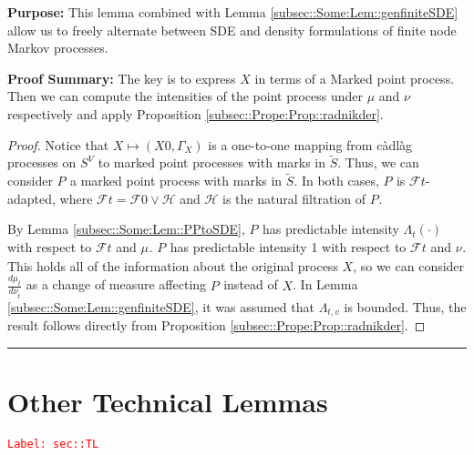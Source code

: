 \documentclass[12pt]{article}
\newcommand{\mc}{\mathcal}
\newcommand{\tr}{\textcolor{red}}
\newcommand{\labe}[1]{\tr{\texttt{Label: #1}}}
\newcommand{\purpose}{\textbf{Purpose: }}
\newcommand{\pfsum}{\textbf{Proof Summary: }}
\newcommand{\ind}{\hspace{24pt}}
\newcommand{\lin}{\rule{\linewidth}{0.4 pt}}
\renewcommand{\v}{v}							%
\renewcommand{\S}{S}							%
\renewcommand{\t}{t}							%
\newcommand{\F}{\mc{F}}							%
\newcommand{\FH}[2]{\mc{H}}						%
\newcommand{\X}{X}								%
\newcommand{\V}{V}									%
\newcommand{\rp}[1]{P^{#1}}							%
\newcommand{\m}[3]{\mu_{#2#1}^{#3}}						%
\newcommand{\mm}[3]{\nu_{#2#1}^{#3}}						%
\newcommand{\ratee}[1]{\Lambda_{#1}}				%
\newcommand{\alt}{\widetilde}						%
\newcommand{\pmap}[1]{\Gamma_{#1}}				%
\begin{document}
\purpose This lemma combined with Lemma \ref{subsec::Some:Lem::genfiniteSDE} allow us to freely alternate between SDE and density formulations of finite node Markov processes.

\pfsum The key is to express \(X\) in terms of a Marked point process. Then we can compute the intensities of the point process under \(\mu\) and \(\nu\) respectively and apply Proposition \ref{subsec::Prope:Prop::radnikder}.

\begin{proof}
Notice that \(\X{}{} \mapsto (\X{}{0},\pmap{\X{}{}})\) is a one-to-one mapping from c\`adl\`ag processes on \(\S^\V\) to marked point processes with marks in \(\alt{\S}\). Thus, we can consider \(\rp{}\) a marked point process with marks in \(\alt{\S}\). In both cases, \(\rp{}\) is \(\F{}{\t}\)-adapted, where \(\F{}{\t} = \F{}{0}\vee \FH{}{\t}\) and \(\FH{}{\t}\) is the natural filtration of \(\rp{}\).

\ind By Lemma \ref{subsec::Some:Lem::PPtoSDE}, \(\rp{}\) has predictable intensity \(\ratee{\t}(\cdot)\) with respect to \(\F{}{\t}\) and \(\m{}{}{}\). \(\rp{}\) has predictable intensity 1 with respect to \(\F{}{\t}\) and \(\mm{}{}{}\). This holds all of the information about the original process \(\X{}{}\), so we can consider \(\frac{d\m{}{\t}{}}{d\mm{}{\t}{}}\) as a change of measure affecting \(\rp{}\) instead of \(\X{}{}\). In Lemma \ref{subsec::Some:Lem::genfiniteSDE}, it was assumed that \(\ratee{\t,\v}\) is bounded. Thus, the result follows directly from Proposition \ref{subsec::Prope:Prop::radnikder}. 
\end{proof}

\lin
\section{Other Technical Lemmas}
\label{sec::TL}\labe{sec::TL}
\end{document}
